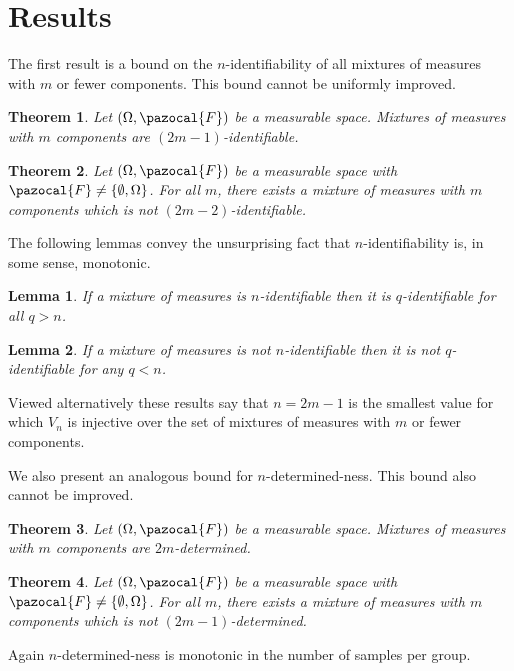 \documentclass[aos]{imsart}
\def\sF{\pazocal{F}}
\theoremstyle{plain}
\newtheorem{thm}{Theorem}[section]
\newtheorem{lem}{Lemma}[section]
\theoremstyle{defintion}
\begin{document}
	\section{Results}
	The first result is a bound on the $n$-identifiability of all mixtures of measures with $m$ or fewer components. This bound cannot be uniformly improved.
	\begin{thm} \label{thm:ident}
		Let $\left( \Omega,\sF \right)$ be a measurable space. Mixtures of measures with $m$ components are $(2m-1)$-identifiable.
	\end{thm}

	\begin{thm} \label{thm:noident}
		Let $\left( \Omega, \sF \right)$ be a measurable space with $\sF \neq \left\{ \emptyset,\Omega \right\}$. For all $m$, there exists a mixture of measures with $m$ components which is not $(2m-2)$-identifiable.
	\end{thm}
	The following lemmas convey the unsurprising fact that $n$-identifiability is, in some sense, monotonic.
	\begin{lem}\label{lem:ident}
		If a mixture of measures is $n$-identifiable then it is $q$-identifiable for all $q>n$.
	\end{lem}
	\begin{lem} \label{lem:noident}
		If a mixture of measures is not $n$-identifiable then it is not $q$-identifiable for any $q<n$.
	\end{lem}
	Viewed alternatively these results say that $n=2m-1$ is the smallest value for which $V_{n}$ is injective over the set of mixtures of measures with $m$ or fewer components.

	We also present an analogous bound for $n$-determined-ness. This bound also cannot be improved.
	\begin{thm}\label{thm:det}
		Let $\left( \Omega,\sF \right)$ be a measurable space. Mixtures of measures with $m$ components are $2m$-determined.
	\end{thm}

	\begin{thm} \label{thm:nodet}
		Let $\left( \Omega, \sF \right)$ be a measurable space with $\sF \neq \left\{ \emptyset,\Omega \right\}$. For all $m$, there exists a mixture of measures with $m$ components which is not $(2m-1)$-determined.
	\end{thm}

	Again $n$-determined-ness is monotonic in the number of samples per group.
\end{document}
